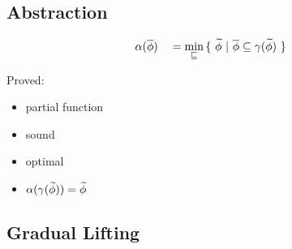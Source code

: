 \documentclass[11pt,a4paper]{article}
\begin{document}
\subsection{Abstraction}
\begin{align*}
&\alpha(\overline{\phi}) &&= \min_{\sqsubseteq} {\{~ \widetilde{\phi} ~|~ \overline{\phi} \subseteq \gamma(\widetilde{\phi}) ~\}}\\
\end{align*}

Proved:
\begin{itemize}
	\item partial function
	\item sound
	\item optimal
	\item $\alpha(\gamma(\widetilde{\phi})) = \widetilde{\phi}$
\end{itemize}






\subsection{Gradual Lifting}
\end{document}

